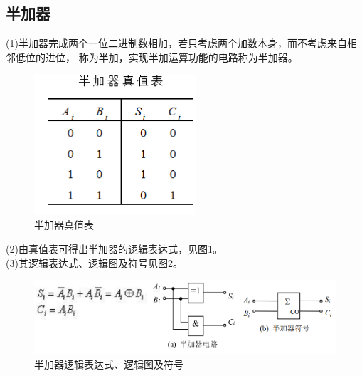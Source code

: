 \documentclass[a4paper,11pt,UTF8]{ctexart}
\begin{document}
 \subsection{半加器}
 (1)半加器完成两个一位二进制数相加，若只考虑两个加数本身，而不考虑来自相邻低位的进位，
 称为半加，实现半加运算功能的电路称为半加器。\\
 \begin{figure}[H]
  \centering
  \includegraphics[width=6cm]{jfqpic1}
  \caption{半加器真值表}
  \label{fig:jfqpic1}
\end{figure}
 (2)由真值表可得出半加器的逻辑表达式，见图1。\\
 (3)其逻辑表达式、逻辑图及符号见图2。
 \begin{figure}[H]
  \centering
  \includegraphics[width=14cm]{jfqpic2}
  \caption{半加器逻辑表达式、逻辑图及符号}
  \label{fig:jfqpic2}
 \end{figure}
\end{document}
